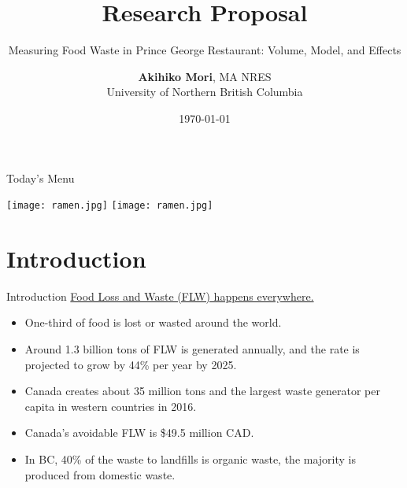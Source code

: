 \documentclass{beamer}\usepackage[]{graphicx}\usepackage[]{xcolor}
\title{Research Proposal}
\subtitle{Measuring Food Waste in Prince George Restaurant: Volume, Model, and Effects}
\author{\textbf{Akihiko Mori}, MA NRES \texorpdfstring{\\University of Northern British Columbia}
\texorpdfstring{\\Supervisor: Dr. Deo Balbinder}{}}
\date{\today}
\begin{document}
\begin{frame}
    \maketitle
\end{frame}

\begin{frame}{Today's Menu}
    \begin{minipage}[t][0.6\textheight]{0.6\textwidth}
        \vspace{0pt} 
        \tableofcontents[hideallsubsections]
    \end{minipage}
    \begin{minipage}[t]{0.35\textwidth} 
        \vspace{0pt}  
        \texttt{[image: ramen.jpg]}
        \texttt{[image: ramen.jpg]}
    \end{minipage}
\end{frame}

\section{Introduction}
\begin{frame}{Introduction}
    \underline{Food Loss and Waste (FLW) happens everywhere.}
    \begin{itemize}
        \item One-third of food is lost or wasted around the world\cite{Gustavsson2011-em}.
        \item Around 1.3 billion tons of FLW is generated annually, and the rate is projected to grow by 44\% per year by 2025\cite{Blakeney2019-jk}.
    \end{itemize}
    \begin{itemize}
        \item Canada creates about 35 million tons and the largest waste generator per capita in western countries in 2016\cite{Nzwc2016-jl}.
        \item Canada's avoidable FLW is \$49.5 million CAD\cite{Gooch2019-gd}.
    \end{itemize}
    \begin{itemize}
        \item In BC, 40\% of the waste to landfills is organic waste, the majority is produced from domestic waste\cite{BCwaste}.
    \end{itemize}
\end{frame}
\end{document}
